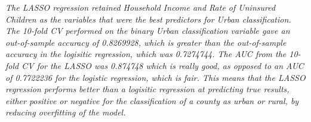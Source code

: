 \documentclass[]{article}
\begin{document}
\emph{The LASSO regression retained Household Income and Rate of
Uninsured Children as the variables that were the best predictors for
Urban classification. The 10-fold CV performed on the binary Urban
classification variable gave an out-of-sample accuracy of 0.8269928,
which is greater than the out-of-sample accuracy in the logisitic
regression, which was 0.7274744. The AUC from the 10-fold CV for the
LASSO was 0.874748 which is really good, as opposed to an AUC of
0.7722236 for the logistic regression, which is fair. This means that
the LASSO regression performs better than a logisitic regression at
predicting true results, either positive or negative for the
classification of a county as urban or rural, by reducing overfitting of
the model.}
\end{document}
